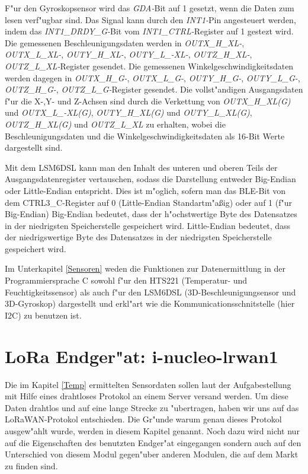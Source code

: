 F"ur den Gyroskopsensor wird das \textit{GDA-}Bit auf 1 gesetzt, wenn die Daten zum lesen verf"ugbar sind. Das Signal kann durch den \textit{INT1-}Pin angesteuert werden, indem  das \textit{INT1\_DRDY\_G-}Bit vom \textit{INT1\_CTRL-}Register auf 1 gestezt wird. Die gemessenen Beschleunigungsdaten werden in \textit{OUTX\_H\_XL-}, \textit{OUTX\_L\_XL-}, \textit{OUTY\_H\_XL-}, \textit{OUTY\_L\_-XL-}, \textit{OUTZ\_H\_XL-}, \textit{OUTZ\_L\_XL-}Register gesendet. Die gemessenen Winkelgeschwindigkeitsdaten werden dagegen in \textit{OUTX\_H\_G-}, \textit{OUTX\_L\_G-}, \textit{OUTY\_H\_G-}, \textit{OUTY\_L\_G-}, \textit{OUTZ\_H\_G-}, \textit{OUTZ\_L\_G-}Register gesendet. Die vollst"andigen Ausgangsdaten f"ur die X-,Y- und Z-Achsen sind durch die Verkettung von \textit{OUTX\_H\_XL(G)} und \textit{OUTX\_L\_-XL(G)}, \textit{OUTY\_H\_XL(G)} und \textit{OUTY\_L\_XL(G)}, \textit{OUTZ\_H\_XL(G)} und \textit{OUTZ\_L\_XL} zu erhalten, wobei die Beschleunigungsdaten und die Winkelgeschwindigkeitsdaten als 16-Bit Werte dargestellt sind.

Mit dem LSM6DSL kann man den Inhalt des unteren und oberen Teils der Ausgangsdatenregister vertauschen, sodass die Darstellung entweder Big-Endian oder Little-Endian entspricht. Dies ist m"oglich, sofern man das BLE-Bit von dem CTRL3\_C-Register auf 0 (Little-Endian Standartm"a\ss{}ig) oder auf 1 (f"ur Big-Endian) 
Big-Endian bedeutet, dass der h"ochstwertige Byte des Datensatzes in der niedrigsten Speicherstelle gespeichert wird.
Little-Endian bedeutet, dass der niedrigswertige Byte des Datensatzes in der niedrigsten Speicherstelle gespeichert wird.


Im Unterkapitel \ref{Sensoren} weden die Funktionen zur Datenermittlung in der Programmiersprache C sowohl f"ur den HTS221 (Temperatur- und Feuchtigkeitssensor) als auch f"ur den LSM6DSL (3D-Beschleunigungsensor und 3D-Gyroskop) dargestellt und erkl"art wie die Kommunicationsschnitstelle (hier I2C) zu benutzen ist.


\vspace{5cm}
\section{LoRa Endger"at: i-nucleo-lrwan1}\label{LoRa Modul}

Die im Kapitel \ref{Temp} ermittelten Sensordaten sollen laut der Aufgabestellung mit Hilfe eines drahtloses Protokol an einem Server versand werden. Um diese Daten drahtlos und auf eine lange Strecke zu "ubertragen, haben wir uns auf das LoRaWAN-Protokol entschieden. Die Gr"unde warum genau dieses Protokol ausgew"ahlt wurde, werden in diesem Kapitel genannt. Noch dazu wird nicht nur auf die Eigenschaften des benutzten Endger"at eingegangen sondern auch auf den Unterschied von diesem Modul gegen"uber anderen Modulen, die auf dem Markt zu finden sind.   
 
